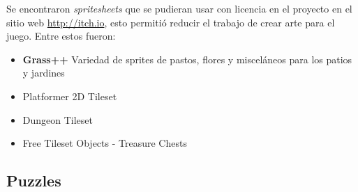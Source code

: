 Se encontraron \textit{spritesheets} que se pudieran usar con licencia en el proyecto en el sitio web \url{http://itch.io}, esto permitió reducir el trabajo de crear arte para el juego.
Entre estos fueron:
\begin{itemize}
    \item \textbf{Grass++} Variedad de sprites de pastos, flores y misceláneos para los patios y jardines
    \item Platformer 2D Tileset
    \item Dungeon Tileset
    \item Free Tileset Objects - Treasure Chests
\end{itemize}

\subsection{Puzzles}
